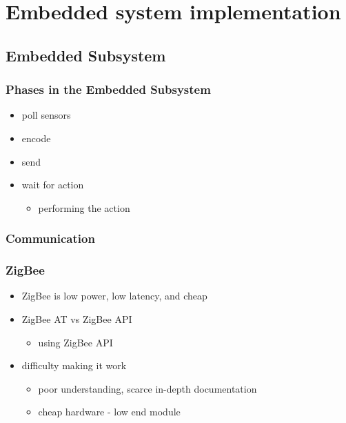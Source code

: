 \section{Embedded system implementation}
\subsection{Embedded Subsystem}
  \begin{frame}
	\frametitle{Phases in the Embedded Subsystem}
  	\begin{itemize}
  		\item poll sensors
  		\item encode
  		\item send
  		\item wait for action
        \begin{itemize}
            \item performing the action
        \end{itemize}
  	\end{itemize}
  \end{frame}
  

\subsubsection{Communication}
  \begin{frame}
  	\frametitle{ZigBee}
  	\begin{itemize}
  		\item ZigBee is low power, low latency, and cheap
  		\item ZigBee AT vs ZigBee API
        \begin{itemize}
            \item using ZigBee API
        \end{itemize}
  		\item difficulty making it work
        \begin{itemize}
            \item poor understanding, scarce in-depth documentation
            \item cheap hardware - low end module
        \end{itemize}
  	\end{itemize}
  \end{frame}
  


